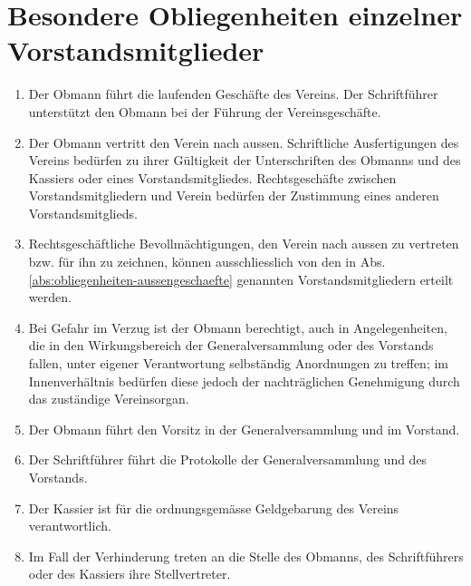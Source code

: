 \documentclass[a4paper,12pt]{article}
\begin{document}
	\section{Besondere Obliegenheiten einzelner Vorstandsmitglieder}
		\label{sec:obliegenheiten-vorstand}
		\begin{enumerate}
			\item Der Obmann führt die laufenden Geschäfte des Vereins. Der Schriftführer unterstützt den Obmann bei der Führung der Vereinsgeschäfte.
			\item Der Obmann vertritt den Verein nach aussen. Schriftliche Ausfertigungen des Vereins bedürfen zu ihrer Gültigkeit der Unterschriften des Obmanns und des Kassiers oder eines Vorstandsmitgliedes. Rechtsgeschäfte zwischen Vorstandsmitgliedern und Verein bedürfen der Zustimmung eines anderen Vorstandsmitglieds.
			\label{abs:obliegenheiten-aussengeschaefte}
			\item Rechtsgeschäftliche Bevollmächtigungen, den Verein nach aussen zu vertreten bzw. für ihn zu zeichnen, können ausschliesslich von den in Abs. \ref{abs:obliegenheiten-aussengeschaefte} genannten Vorstandsmitgliedern erteilt werden.
			\item Bei Gefahr im Verzug ist der Obmann berechtigt, auch in Angelegenheiten, die in den Wirkungsbereich der Generalversammlung oder des Vorstands fallen, unter eigener Verantwortung selbständig Anordnungen zu treffen; im Innenverhältnis bedürfen diese jedoch der nachträglichen Genehmigung durch das zuständige Vereinsorgan.
			\item Der Obmann führt den Vorsitz in der Generalversammlung und im Vorstand.
			\item Der Schriftführer führt die Protokolle der Generalversammlung und des Vorstands.
			\item Der Kassier ist für die ordnungsgemässe Geldgebarung des Vereins verantwortlich.
			\item Im Fall der Verhinderung treten an die Stelle des Obmanns, des Schriftführers oder des Kassiers ihre Stellvertreter.
		\end{enumerate}
\end{document}
